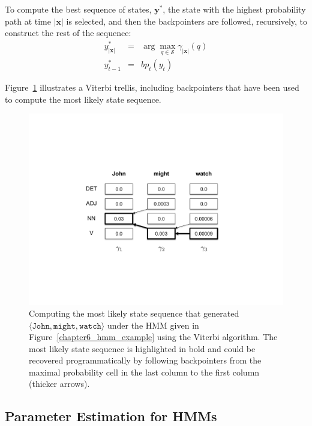 \noindent To compute the best sequence of states, $\textbf{y}^*$, the
state with the highest probability path at time $|\textbf{x}|$ is
selected, and then the backpointers are followed, recursively, to
construct the rest of the sequence:
\begin{eqnarray}
y_{|\textbf{x}|}^*& =& \arg \max_{q \in \mathcal{S}} \gamma_{|\textbf{x}|}(q)\\
y_{t-1}^* &=& bp_t(y_t)
\end{eqnarray}

\noindent Figure~\ref{chapter6_fig_question2} illustrates a Viterbi
trellis, including backpointers that have been used to compute the
most likely state sequence.

\begin{figure}[t]
\begin{center}
\includegraphics[scale=0.55]{figures/fig-ch6-q2.pdf}
\end{center}\caption{Computing the most likely state sequence that generated $\langle \texttt{John} , \texttt{might} , \texttt{watch} \rangle$ under the HMM given in Figure~\ref{chapter6_hmm_example} using the Viterbi algorithm.  The most likely state sequence is highlighted in bold and could be recovered programmatically by following backpointers from the maximal probability cell in the last column to the first column (thicker arrows).}\label{chapter6_fig_question2}
\end{figure}


\subsection{Parameter Estimation for HMMs}
\label{chapter6_forward_backward}

